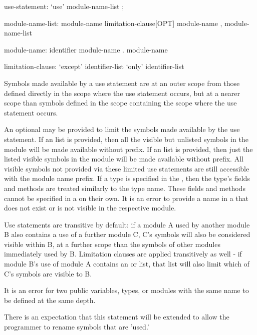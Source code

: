 \begin{syntax}
use-statement:
  `use' module-name-list ;

module-name-list:
  module-name limitation-clause[OPT]
  module-name , module-name-list

module-name:
  identifier
  module-name . module-name

limitation-clause:
  `except' identifier-list
  `only' identifier-list
\end{syntax}

Symbols made available by a use statement are at an outer scope from those
defined directly in the scope where the use statement occurs, but at a
nearer scope than symbols defined in the scope containing the scope where
the use statement occurs.

An optional  may be provided to limit the symbols made
available by the use statement.  If an  list is provided, then all
the visible but unlisted symbols in the module will be made available without
prefix.  If an  list is provided, then just the listed visible
symbols in the module will be made available without prefix.  All visible
symbols not provided via these limited use statements are still accessible with
the module name prefix.  If a type is specified in the ,
then the type's fields and methods are treated similarly to the type name.
These fields and methods cannot be specified in a  on
their own.  It is an error to provide a name in a  that
does not exist or is not visible in the respective module.

Use statements are transitive by default: if a module A used by
another module B also contains a use of a further module C, C's
symbols will also be considered visible within B, at a further scope
than the symbols of other modules immediately used by B.  Limitation clauses
are applied transitively as well - if module B's use of module A contains an
 or  list, that list will also limit which of C's
symbols are visible to B.


It is an error for two public variables, types, or modules with the same
name to be defined at the same depth.

\begin{openissue}
There is an expectation that this statement will be extended to allow
the programmer to rename symbols that are 'used.'
\end{openissue}

